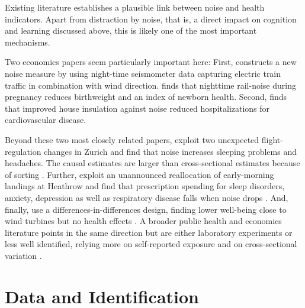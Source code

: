\documentclass[11pt]{article}
\begin{document}
\bigskip

 Existing literature establishes a plausible link between noise and health indicators. Apart from distraction by noise, that is, a direct impact on cognition and learning discussed above, this is likely one of the most important mechanisms. 

Two economics papers seem particularly important here: First, \textcite[working paper]{greenhillNoisePollutionInfant2026} constructs a new noise measure by using night-time seismometer data capturing electric train traffic in combination with wind direction. \textcite{greenhillNoisePollutionInfant2026} finds that nighttime rail-noise during pregnancy reduces birthweight and an index of newborn health. Second, \textcite[working paper]{lindgrenSoundEnvironmentHealth2021} finds that improved house insulation against noise reduced hospitalizations for cardiovascular disease.

Beyond these two most closely related papers, \textcite{boesAIRCRAFTNOISEHEALTH2013} exploit two unexpected flight-regulation changes in Zurich and find that noise increases sleeping problems and headaches. The causal estimates are larger than cross-sectional estimates because of sorting \parencite{boesAIRCRAFTNOISEHEALTH2013}.  Further, \textcite{beghelliHealthBenefitsReducing2023} exploit an unannounced reallocation of early-morning landings at Heathrow and find that prescription spending for sleep disorders, anxiety, depression as well as respiratory disease falls when noise drops \parencite[see also][]{wangImpactAeroplaneNoise2022}. And, finally, \textcite{krekelDoesPresenceWind2017, krekelWindTurbinesHave2023} use a differences-in-differences design, finding lower well-being close to wind turbines but no health effects \parencite[see also,][]{zouWindTurbineSyndrome2017}. A broader public health and economics literature points in the same direction but are either laboratory experiments or less well identified, relying more on self-reported exposure and on cross-sectional variation \parencite[see, e.g.,][]{vanpraagUsingHappinessSurveys2005, basnerWHOEnvironmentalNoise2018, basnerNocturnalAircraftNoise2008, griefahnNoiseEmittedRoad2006, bodinAnnoyanceSleepConcentration2015, trimmelEffectsLowIntensity2012}. 

\section{Data and Identification}
\end{document}
